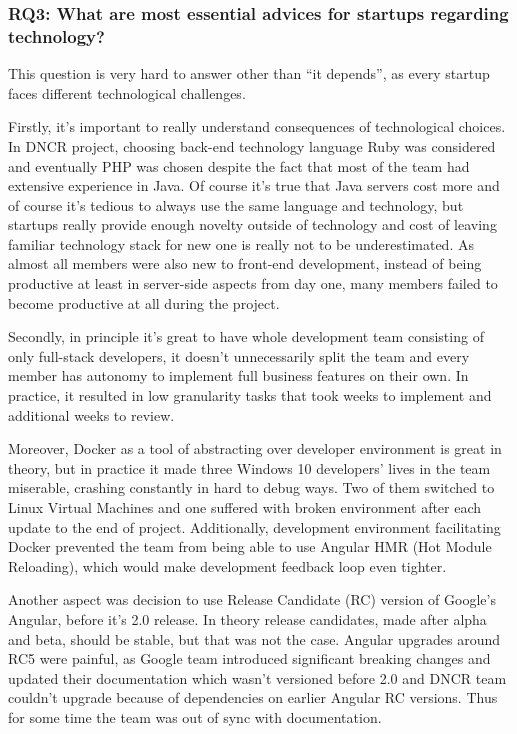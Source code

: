 \documentclass{article}
\begin{document}
\subsubsection{RQ3: What are most essential advices for startups regarding technology?}
This question is very hard to answer other than ``it depends'', as every startup faces different technological challenges.

Firstly, it's important to really understand consequences of technological choices. In DNCR project, choosing back-end technology language Ruby was considered and eventually PHP was chosen despite the fact that most of the team had extensive experience in Java. Of course it's true that Java servers cost more and of course it's tedious to always use the same language and technology, but startups really provide enough novelty outside of technology and cost of leaving familiar technology stack for new one is really not to be underestimated. As almost all members were also new to front-end development, instead of being productive at least in server-side aspects from day one, many members failed to become productive at all during the project.

Secondly, in principle it's great to have whole development team consisting of only full-stack developers, it doesn't unnecessarily split the team and every member has autonomy to implement full business features on their own. In practice, it resulted in low granularity tasks that took weeks to implement and additional weeks to review.

Moreover, Docker as a tool of abstracting over developer environment is great in theory, but in practice it made three Windows 10 developers' lives in the team miserable, crashing constantly in hard to debug ways. Two of them switched to Linux Virtual Machines and one suffered with broken environment after each update to the end of project. Additionally, development environment facilitating Docker prevented the team from being able to use Angular HMR (Hot Module Reloading), which would make development feedback loop even tighter.

Another aspect was decision to use Release Candidate (RC) version of Google's Angular, before it's 2.0 release. In theory release candidates, made after alpha and beta, should be stable, but that was not the case. Angular upgrades around RC5 were painful, as Google team introduced significant breaking changes and updated their documentation which wasn't versioned before 2.0 and DNCR team couldn't upgrade because of dependencies on earlier Angular RC versions. Thus for some time the team was out of sync with documentation.
\end{document}
